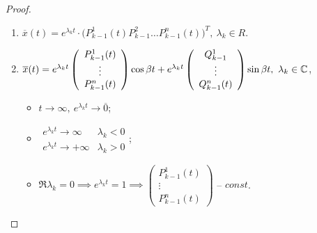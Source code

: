 \begin{proof}\leavevmode
	\begin{enumerate}
		\item $\overline{x} (t) = e^{\lambda_k t} \cdot \big(P_{k-1}^{1} (t) P_{k-1}^{2} \ldots P_{k-1}^{n} (t) \big)^T, \ \lambda _k \in R$.
		\item $\overline{x} (t) = e^{\lambda_k t} \left(\begin{array}{c}
					      P_{k-1}^{1} (t) \\ \vdots \\ P_{k-1}^{n} (t)
				      \end{array}\right) \cos \beta t + e^{\lambda _k t} \left(\begin{array}{c}
					      Q_{k-1}^{1} \\ \vdots \\ Q_{k-1}^{n} (t)
				      \end{array}\right) \sin \beta t, \ \lambda _k \in \mathbb{C}$,
		      \begin{itemize}
			      \item $t \rightarrow \infty , \ e^{\lambda _k t} \rightarrow \overline{0} $;
			      \item $\begin{array}{ll}
					            e^{\lambda _k t} \rightarrow \infty  & \lambda _k < 0 \\
					            e^{\lambda _k t} \rightarrow +\infty & \lambda _k > 0
				            \end{array}$;
			      \item $\Re \lambda _k = 0 \implies e^{\lambda _k t} = 1 \implies  \left(\begin{array}{c}
						            P_{k-1}^{1} (t) \\ \vdots \\ P_{k-1}^{n} (t)
					            \end{array}\right)$ -- $const$.
		      \end{itemize}
	\end{enumerate}
\end{proof}

